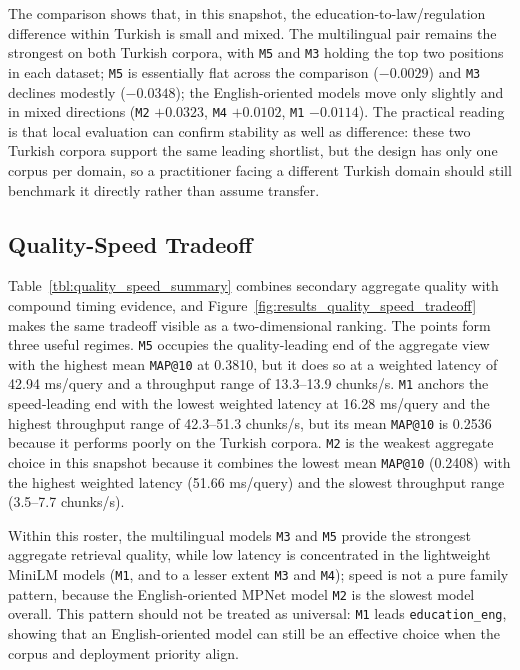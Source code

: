 The comparison shows that, in this snapshot, the education-to-law/regulation difference within Turkish is small and mixed. The multilingual pair remains the strongest on both Turkish corpora, with \texttt{M5} and \texttt{M3} holding the top two positions in each dataset; \texttt{M5} is essentially flat across the comparison ($-0.0029$) and \texttt{M3} declines modestly ($-0.0348$); the English-oriented models move only slightly and in mixed directions (\texttt{M2} $+0.0323$, \texttt{M4} $+0.0102$, \texttt{M1} $-0.0114$). The practical reading is that local evaluation can confirm stability as well as difference: these two Turkish corpora support the same leading shortlist, but the design has only one corpus per domain, so a practitioner facing a different Turkish domain should still benchmark it directly rather than assume transfer.

\subsection{Quality-Speed Tradeoff}\label{quality-speed-tradeoff}

Table~\ref{tbl:quality_speed_summary} combines secondary aggregate quality with compound timing evidence, and Figure~\ref{fig:results_quality_speed_tradeoff} makes the same tradeoff visible as a two-dimensional ranking. The points form three useful regimes. \texttt{M5} occupies the quality-leading end of the aggregate view with the highest mean \texttt{MAP@10} at 0.3810, but it does so at a weighted latency of 42.94 ms/query and a throughput range of 13.3--13.9 chunks/s. \texttt{M1} anchors the speed-leading end with the lowest weighted latency at 16.28 ms/query and the highest throughput range of 42.3--51.3 chunks/s, but its mean \texttt{MAP@10} is 0.2536 because it performs poorly on the Turkish corpora. \texttt{M2} is the weakest aggregate choice in this snapshot because it combines the lowest mean \texttt{MAP@10} (0.2408) with the highest weighted latency (51.66 ms/query) and the slowest throughput range (3.5--7.7 chunks/s).

Within this roster, the multilingual models \texttt{M3} and \texttt{M5} provide the strongest aggregate retrieval quality, while low latency is concentrated in the lightweight MiniLM models (\texttt{M1}, and to a lesser extent \texttt{M3} and \texttt{M4}); speed is not a pure family pattern, because the English-oriented MPNet model \texttt{M2} is the slowest model overall. This pattern should not be treated as universal: \texttt{M1} leads \texttt{education\_eng}, showing that an English-oriented model can still be an effective choice when the corpus and deployment priority align.


